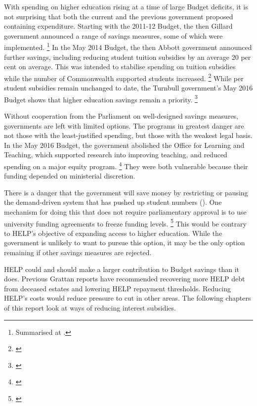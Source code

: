 \documentclass[embargoed]{grattan}
\begin{document}
With spending on higher education rising at a time of large Budget deficits, it is not surprising that both the current and the previous government proposed containing expenditure.
Starting with the 2011-12 Budget, the then Gillard government announced a range of savings measures, some of which were implemented.%
\footnote{Summarised at \textcite[][p. 12]{Warburton2016ResourcingAustraliastertiary}.} In the May 2014 Budget, the then Abbott government announced further savings, including reducing student tuition subsidies by an average 20 per cent on average.
This was intended to stabilise spending on tuition subsidies while the number of Commonwealth supported students increased.%
\footnote{\textcite[][p. 67-69]{Education2014Portfoliobudgetstatements}} While per student subsidies remain unchanged to date, the Turnbull government's May 2016 Budget shows that higher education savings remain a priority.%
\footnote{\textcite{Education2016DrivingInnovationFairness}}

Without cooperation from the Parliament on well-designed savings measures, governments are left with limited options.
The programs in greatest danger are not those with the least-justified spending, but those with the weakest legal basis.
In the May 2016 Budget, the government abolished the Office for Learning and Teaching, which supported research into improving teaching, and reduced spending on a major equity program.%
\footnote{\textcite[][p 57]{Education2016Portfoliobudgetstatements}} They were both vulnerable because their funding depended on ministerial discretion.

There is a danger that the government will save money by restricting or pausing the demand-driven system that has pushed up student numbers ().
One mechanism for doing this that does not require parliamentary approval is to use university funding agreements to freeze funding levels.%
\footnote{\textcite[][chapter 7]{Norton2013Keepcapsoff}} This would be contrary to \gls{HELP}'s objective of expanding access to higher education.
While the government is unlikely to want to pursue this option, it may be the only option remaining if other savings measures are rejected.

\gls{HELP} could and should make a larger contribution to Budget savings than it does.
Previous Grattan reports have recommended recovering more \gls{HELP} debt from deceased estates and lowering \gls{HELP} repayment thresholds.
Reducing \gls{HELP}'s costs would reduce pressure to cut in other areas.
The following chapters of this report look at ways of reducing interest subsidies.
\end{document}
